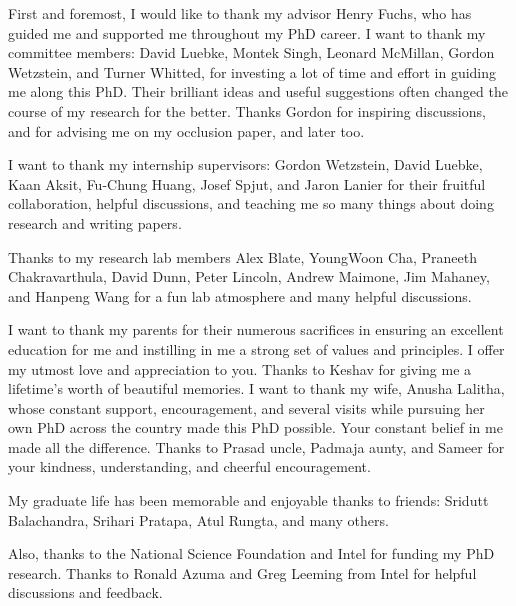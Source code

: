 \begin{acknowledgement}

First and foremost, I would like to thank my advisor Henry Fuchs, who has guided me and supported me throughout my PhD career. 
I want to thank my committee members: David Luebke, Montek Singh, Leonard McMillan, Gordon Wetzstein, and Turner Whitted, for investing a lot of time and effort in guiding me along this PhD. 
Their brilliant ideas and useful suggestions often changed the course of my research for the better. 
Thanks Gordon for inspiring discussions, and for advising me on my occlusion paper, and later too. 

I want to thank my internship supervisors: Gordon Wetzstein, David Luebke, Kaan Aksit, Fu-Chung Huang, Josef Spjut, and Jaron Lanier for their fruitful collaboration, helpful discussions, and teaching me so many things about doing research and writing papers. 

Thanks to my research lab members Alex Blate, YoungWoon Cha, Praneeth Chakravarthula, David Dunn, Peter Lincoln, Andrew Maimone, Jim Mahaney, and Hanpeng Wang for a fun lab atmosphere and many helpful discussions. 

I want to thank my parents for their numerous sacrifices in ensuring an excellent education for me and instilling in me a strong set of values and principles. I offer my utmost love and appreciation to you. Thanks to Keshav for giving me a lifetime's worth of beautiful memories. I want to thank my wife, Anusha Lalitha, whose constant support, encouragement, and several visits while pursuing her own PhD across the country made this PhD possible. Your constant belief in me made all the difference. Thanks to Prasad uncle, Padmaja aunty, and Sameer for your kindness, understanding, and cheerful encouragement.

My graduate life has been memorable and enjoyable thanks to friends: Sridutt Balachandra, Srihari Pratapa, Atul Rungta, and many others. 

Also, thanks to the National Science Foundation and Intel for funding my PhD research. Thanks to Ronald Azuma and Greg Leeming from Intel for helpful discussions and feedback.

\end{acknowledgement}